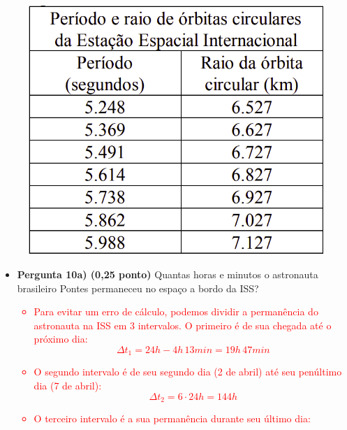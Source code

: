 \documentclass[a4paper, 12pt]{article}
\newcommand{\red}[1]{\textcolor{red}{#1}}
\begin{document}
\begin{flushleft}
\begin{itemize}
                \begin{figure}[H]
                    \centering
                    \includegraphics[scale=0.35]{img/10.png}
                \end{figure}
                \begin{itemize}
                    \item \textbf{Pergunta 10a) (0,25 ponto)}  Quantas horas e minutos o astronauta brasileiro Pontes permaneceu no espaço a bordo da ISS?
                        \red{\begin{itemize}
                            \item Para evitar um erro de cálculo, podemos dividir a permanência do astronauta na ISS em 3 intervalos. O primeiro é de sua chegada até o próximo dia:
                                \begin{equation*}
                                    \Delta t_1=24h - 4h \, 13min=19h \, 47min
                                \end{equation*}
                            \item O segundo intervalo é de seu segundo dia (2 de abril) até seu penúltimo dia (7 de abril):
                                \begin{equation*}
                                    \Delta t_2=6 \cdot 24h=144h
                                \end{equation*}
                            \item O terceiro intervalo é a sua permanência durante seu último dia:

\end{itemize}}
\end{itemize}
\end{itemize}
\end{flushleft}
\end{document}
